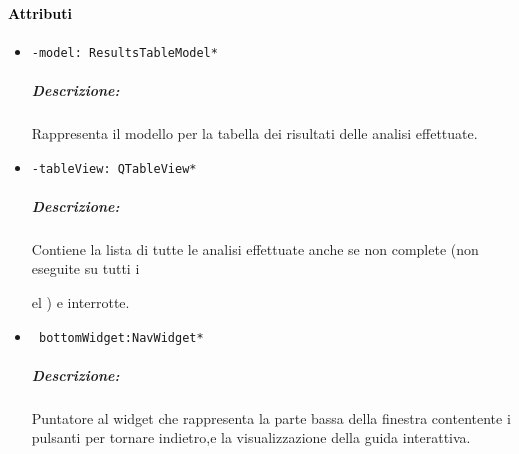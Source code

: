 \paragraph{\textcolor{black}{Attributi\\}}
\begin{itemize}
\item\color{teal}\verb!-model: ResultsTableModel*!
\color{black}
\subparagraph{Descrizione: } Rappresenta il modello per la tabella dei risultati delle analisi effettuate.

\item\color{teal}\verb!-tableView: QTableView*!
\color{black}
\subparagraph{Descrizione: }  
Contiene la lista di tutte le analisi effettuate anche se non complete (non eseguite su tutti i \subject del \dataset{}) e interrotte.

\item\color{teal}\verb! bottomWidget:NavWidget*!
\color{black} 
\subparagraph{Descrizione:}
 Puntatore al widget che rappresenta la parte bassa della finestra contentente i pulsanti per tornare indietro,e la visualizzazione della guida interattiva.
\end{itemize}
